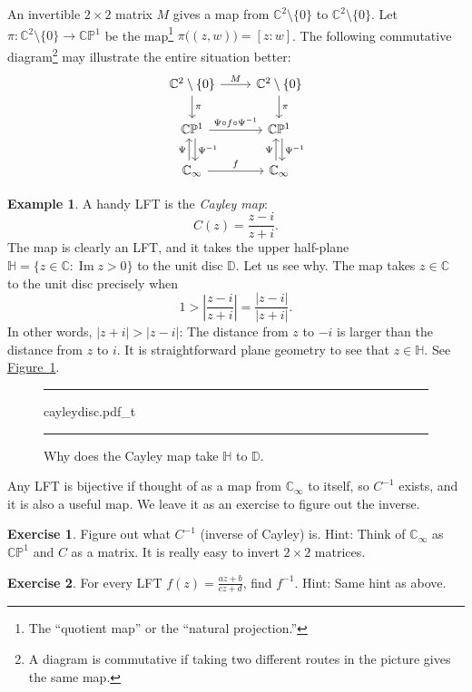 \documentclass[12pt,openany]{book}
\renewcommand{\Im}{\operatorname{Im}}
\newcommand{\sabs}[1]{\lvert {#1} \rvert}
\newcommand{\abs}[1]{\left\lvert {#1} \right\rvert}
\newcommand{\C}{{\mathbb{C}}}
\newcommand{\D}{{\mathbb{D}}}
\newcommand{\bH}{{\mathbb{H}}}
\newcommand{\bP}{{\mathbb{P}}}
\newcommand{\myindex}[1]{#1\index{#1}}
\newcommand{\myquote}[1]{``#1''}
\theoremstyle{plain}
\theoremstyle{remark}
\theoremstyle{definition}
\newenvironment{exbox}{%
    \def\FrameCommand{\vrule width 1pt \relax\hspace{10pt}}%
    \MakeFramed{\advance\hsize-\width\FrameRestore}%
}{%
    \endMakeFramed
}
\newenvironment{myfig}{%
\begin{figure}[h!t]
\noindent\rule{\textwidth}{0.5pt}\vspace{12pt}\par\centering}%
{\par\noindent\rule{\textwidth}{0.5pt}
\end{figure}}
\theoremstyle{exercise}
\newtheorem{exercise}{Exercise}[section]
\theoremstyle{example}
\newtheorem{example}[thm]{Example}
\newcommand{\figureref}[1]{\hyperref[#1]{Figure~\ref*{#1}}}
\begin{document}
An invertible $2 \times 2$ matrix $M$ gives a map from
$\C^2 \setminus \{ 0 \}$ to $\C^2 \setminus \{ 0 \}$.
Let $\pi \colon \C^2 \setminus \{ 0 \} \to \C \bP^1$ be the map\footnote{The
\myquote{quotient map} or the \myquote{natural projection.}}
$\pi \bigl( (z,w) \bigr) =
[z:w]$.  The following commutative diagram\footnote{A diagram is
commutative if taking two different routes in the picture
gives the same map.}
may
illustrate the entire situation better:
\begin{equation*}
\begin{tikzcd}
\C^2 \setminus \{ 0 \} \arrow[r,"M"] \arrow[d,"\pi"] &
\C^2 \setminus \{ 0 \} \arrow[d,"\pi"] \\
\C \bP^1 \arrow[r,"\Psi \circ f \circ \Psi^{-1}"] \arrow[d,shift left,"\Psi^{-1}"] &
\C \bP^1 \arrow[d,shift left,"\Psi^{-1}"]
\\
\C_\infty \arrow[r,"f"]\arrow[u,shift left,"\Psi"] &
\C_\infty \arrow[u,shift left,"\Psi"]
\end{tikzcd}
\end{equation*}

\begin{example}
A handy LFT is the
\emph{\myindex{Cayley map}}:
\begin{equation*}
C(z)
=
\frac{z - i}{z + i} .
\end{equation*}
The map is clearly an LFT\@, and it
takes the upper half-plane $\bH = \{ z \in \C : \Im z > 0 \}$ to the
unit disc $\D$.  Let us see why.  The map takes $z \in \C$ to the unit disc
precisely when
\begin{equation*}
1 > \abs{\frac{z - i}{z + i} }
=
\frac{\sabs{z - i}}{\sabs{z + i}} .
\end{equation*}
In other words, $\sabs{z+i} > \sabs{z - i}$: The distance from $z$
to $-i$ is larger than the distance from $z$ to $i$.  It is straightforward
plane geometry to see that $z \in \bH$.  See
\figureref{fig:cayleydisc}.
\begin{myfig}
{cayleydisc.pdf_t}
\caption{Why does the Cayley map take $\bH$ to $\D$.\label{fig:cayleydisc}}
\end{myfig}
\end{example}

Any LFT is bijective if thought of as a map from $\C_\infty$
to itself, so $C^{-1}$ exists, and it is also a useful map.  We leave
it as an exercise to figure out the inverse.

\begin{exbox}
\begin{exercise}
Figure out what $C^{-1}$ (inverse of Cayley) is.  Hint: Think of $\C_\infty$ as $\C \bP^1$
and $C$ as a matrix.  It is really easy to invert $2 \times 2$ matrices.
\end{exercise}

\begin{exercise}
For every LFT $f(z) = \frac{az+b}{cz+d}$, find $f^{-1}$.
Hint: Same hint as above.
\end{exercise}
\end{exbox}
\end{document}
